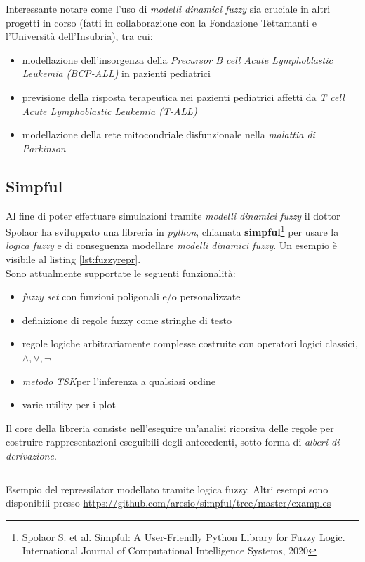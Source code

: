 \documentclass[a4paper,12pt, oneside]{book}
\begin{document}
Interessante notare come l'uso di \textit{modelli dinamici fuzzy} sia cruciale
in altri progetti in corso (fatti in collaborazione con la Fondazione Tettamanti
e l'Università dell'Insubria), tra cui:
\begin{itemize}
  \item modellazione dell'insorgenza della \textit{Precursor B cell Acute
    Lymphoblastic Leukemia (BCP-ALL)} in pazienti pediatrici
  \item previsione della risposta terapeutica nei pazienti pediatrici affetti da
  \textit{T cell Acute Lymphoblastic Leukemia (T-ALL)}  
  \item modellazione della rete mitocondriale disfunzionale nella
  \textit{malattia di Parkinson}  
\end{itemize}
\subsection{Simpful}
Al fine di poter effettuare simulazioni tramite \textit{modelli dinamici fuzzy}
il dottor Spolaor ha sviluppato una libreria in \textit{python}, chiamata
\textbf{simpful}\footnote{Spolaor S. et al. Simpful: A User-Friendly Python
  Library for Fuzzy Logic. International Journal of Computational Intelligence
  Systems, 2020} per usare la \textit{logica fuzzy} e di conseguenza modellare
\textit{modelli dinamici fuzzy}. Un esempio è visibile al listing
\ref{lst:fuzzyrepr}.\\ 
Sono attualmente supportate le seguenti funzionalità:
\begin{itemize}
  \item \textit{fuzzy set} con funzioni poligonali e/o personalizzate
  \item definizione di regole fuzzy come stringhe di testo
  \item regole logiche arbitrariamente complesse costruite con operatori logici
  classici, $\land,\lor,\neg$
  \item \textit{metodo TSK}per l'inferenza a qualsiasi ordine
  \item varie utility per i plot
\end{itemize}
Il core della libreria consiste nell'eseguire un'analisi ricorsiva delle regole
per costruire rappresentazioni eseguibili degli antecedenti, sotto forma di
\textit{alberi di derivazione}.
\begin{listing}
  \scriptsize
  \inputminted{python}{code/fuzzy_repr.py}
  \caption{Esempio del repressilator modellato tramite logica fuzzy. Altri
    esempi sono disponibili presso
    \url{https://github.com/aresio/simpful/tree/master/examples}} 
  \label{lst:fuzzyrepr}
\end{listing}
\end{document}
